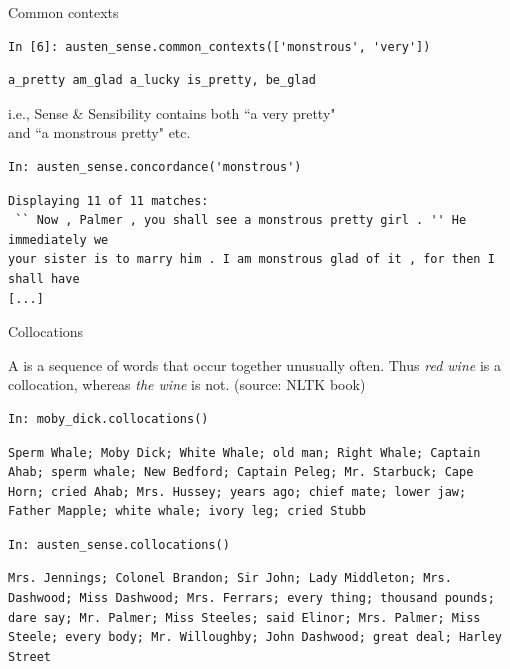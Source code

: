 \documentclass[aspectratio=169,usenames,dvipsnames]{beamer}
\begin{document}
\begin{frame}[fragile]{Common contexts}
\begin{lstlisting}[style=smaller]
In [6]: austen_sense.common_contexts(['monstrous', 'very'])
\end{lstlisting}
\begin{lstlisting}[style=plainsmaller]
a_pretty am_glad a_lucky is_pretty, be_glad
\end{lstlisting}

\pause\vspace{1em}
i.e., Sense \& Sensibility contains both ``a very pretty" \\
    and ``a monstrous pretty" etc.

\begin{lstlisting}
In: austen_sense.concordance('monstrous')
\end{lstlisting}
\begin{lstlisting}[style=plainsmaller]
Displaying 11 of 11 matches:
 `` Now , Palmer , you shall see a monstrous pretty girl . '' He immediately we
your sister is to marry him . I am monstrous glad of it , for then I shall have
[...]
\end{lstlisting}
\end{frame}

\begin{frame}[fragile]{Collocations}
\begin{definition}
    A  is a sequence of words that occur together
    unusually often. Thus \emph{red wine} is a collocation,
    whereas \emph{the wine} is not. (source: NLTK book)
\end{definition}
\begin{lstlisting}
In: moby_dick.collocations()
\end{lstlisting}
\begin{lstlisting}[style=plainsmaller]
Sperm Whale; Moby Dick; White Whale; old man; Right Whale; Captain
Ahab; sperm whale; New Bedford; Captain Peleg; Mr. Starbuck; Cape
Horn; cried Ahab; Mrs. Hussey; years ago; chief mate; lower jaw;
Father Mapple; white whale; ivory leg; cried Stubb
\end{lstlisting}
\begin{lstlisting}
In: austen_sense.collocations()
\end{lstlisting}
\begin{lstlisting}[style=plainsmaller]
Mrs. Jennings; Colonel Brandon; Sir John; Lady Middleton; Mrs.
Dashwood; Miss Dashwood; Mrs. Ferrars; every thing; thousand pounds;
dare say; Mr. Palmer; Miss Steeles; said Elinor; Mrs. Palmer; Miss
Steele; every body; Mr. Willoughby; John Dashwood; great deal; Harley Street
\end{lstlisting}
\end{frame}
\end{document}
